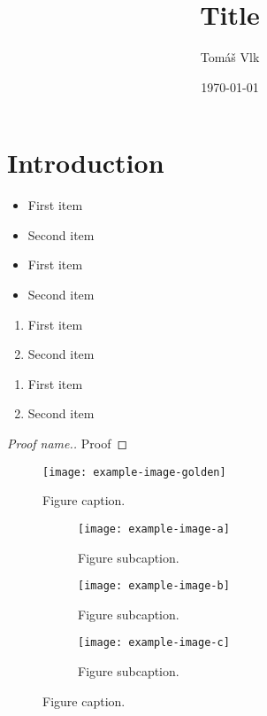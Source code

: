 \documentclass[11pt, a4paper]{article}
\title{Title}
\author{Tomáš Vlk}
\date{\today}
\begin{document}
  \maketitle

  \section{Introduction}
  \label{sec:Introduction}

	\begin{itemize}
		\item First item
		\item Second item
	\end{itemize}

	\begin{itemize}[label={--}]
		\item First item
		\item Second item
	\end{itemize}

	\begin{enumerate}
		\item First item
		\item Second item
	\end{enumerate}

	\begin{enumerate}[label=\alph*)] %
		\item First item
		\item Second item
	\end{enumerate}

	\begin{proof}[Proof name.]
	\label{proof:proof1}
	Proof
	\end{proof}

	\blindtext

	\begin{figure}[ht]
		\centering
		\texttt{[image: example-image-golden]}
		\caption{
			\label{fig:image1}
			Figure caption.
		}
	\end{figure}

	\begin{figure}[ht]
		\centering
		\begin{subfigure}{0.31\textwidth}
			\centering
			\noindent\texttt{[image: example-image-a]}
			\caption{
				\label{fig:subimage1}
				Figure subcaption.
			}
		\end{subfigure}
		\hfill
		\begin{subfigure}{0.31\textwidth}
			\centering
			\noindent\texttt{[image: example-image-b]}
			\caption{
				\label{fig:subimage2}
				Figure subcaption.
			}
		\end{subfigure}
		\hfill
		\begin{subfigure}{0.31\textwidth}
			\centering
			\noindent\texttt{[image: example-image-c]}
			\caption{
				\label{fig:subimage3}
				Figure subcaption.
			}
		\end{subfigure}
		\caption{
			\label{fig:image2}
			Figure caption.
		}
	\end{figure}
\end{document}
